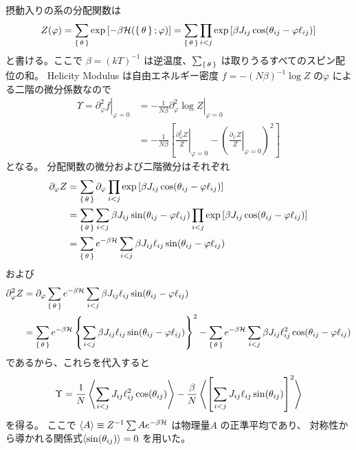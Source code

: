 \documentclass{jsarticle}
\begin{document}
摂動入りの系の分配関数は
\begin{equation}
  Z(\varphi) = \sum_{\set{\theta}} \exp\left[-\beta \mathcal{H}(\set{\theta};\varphi)\right]
  = \sum_{\set{\theta}} \prod_{i<j} \exp\left[\beta J_{ij} \cos(\theta_{ij} - \varphi \ell_{ij})\right]
\end{equation}
と書ける。ここで $\beta = (kT)^{-1}$ は逆温度、$\sum_{\set{\theta}}$ は取りうるすべてのスピン配位の和。
Helicity Modulus は自由エネルギー密度 $f = -(N\beta)^{-1} \log Z$ の$\varphi$ による二階の微分係数なので
\begin{equation}
\begin{split}
  \Upsilon = \left.\partial_\varphi^2 f \right|_{\varphi=0} &= \left.-\frac{1}{N\beta}\partial_\varphi^2\log Z\right|_{\varphi=0} \\
  &= 
  -\frac{1}{N\beta} \left[ 
    \left.\frac{\partial_\varphi^2 Z}{Z}\right|_{\varphi=0}
    -
  \left(\left.\frac{\partial_\varphi Z}{Z}\right|_{\varphi=0}\right)^2 \right]
\end{split}
\end{equation}
となる。
分配関数の微分および二階微分はそれぞれ
\begin{equation}
  \begin{split}
  \partial_\varphi Z
  &=
  \sum_{\set{\theta}} \partial_\varphi \prod_{i<j} \exp\left[\beta J_{ij} \cos(\theta_{ij} - \varphi \ell_{ij})\right] \\
  &=
  \sum_{\set{\theta}} \sum_{i<j} \beta J_{ij} \sin(\theta_{ij} -\varphi \ell_{ij} )\prod_{i<j} \exp\left[\beta J_{ij} \cos(\theta_{ij} - \varphi \ell_{ij})\right] \\
  &=
  \sum_{\set{\theta}} e^{-\beta \mathcal{H}} \sum_{i<j} \beta J_{ij} \ell_{ij} \sin(\theta_{ij} - \varphi \ell_{ij})
\end{split}
\end{equation}
および
\begin{equation}
  \begin{split}
  \partial_\varphi^2 Z
  &=
  \partial_\varphi \sum_{\set{\theta}} e^{-\beta \mathcal{H}} \sum_{i<j} \beta J_{ij} \ell_{ij} \sin(\theta_{ij} - \varphi \ell_{ij}) \\
  &=
  \sum_{\set{\theta}} e^{-\beta \mathcal{H}} \left\{\sum_{i<j} \beta J_{ij} \ell_{ij} \sin(\theta_{ij} - \varphi \ell_{ij}) \right\}^2
  - 
  \sum_{\set{\theta}} e^{-\beta \mathcal{H}} \sum_{i<j} \beta J_{ij} \ell_{ij}^2 \cos(\theta_{ij} - \varphi \ell_{ij})
\end{split}
\end{equation}
であるから、これらを代入すると
\begin{equation}
  \Upsilon =
  \frac{1}{N}\Braket{\sum_{i<j} J_{ij} \ell_{ij}^2 \cos(\theta_{ij})}
  -
  \frac{\beta}{N}\Braket{\left[\sum_{i<j} J_{ij} \ell_{ij} \sin(\theta_{ij})\right]^2}
\label{eq:hm}
\end{equation}
を得る。
ここで $\braket{A} \equiv Z^{-1} \sum A e^{-\beta \mathcal{H}}$ は物理量$A$ の正準平均であり、
対称性から導かれる関係式$\braket{\sin(\theta_{ij})} = 0$ を用いた。
\end{document}
